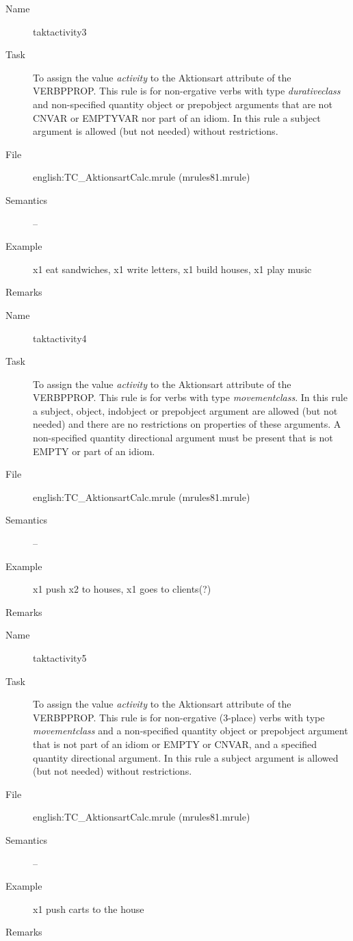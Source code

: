 \begin{description}
\vspace{1 cm}
\begin{description}
\item[Name] taktactivity3
\item[Task] To assign the value {\em activity\/} to the Aktionsart attribute of 
the VERBPPROP. This rule is for non-ergative verbs with type 
{\em durativeclass\/} 
and non-specified quantity object or prepobject arguments that 
are not CNVAR or EMPTYVAR nor part of an idiom.
In this rule a subject argument is allowed (but not needed) without
restrictions.
\item[File] english:TC\_AktionsartCalc.mrule (mrules81.mrule)
\item[Semantics] --
\item[Example] x1 eat sandwiches, x1 write letters, x1 build houses, 
x1 play music
\item[Remarks]
\end{description}

\vspace{1 cm}
\begin{description}
\item[Name] taktactivity4
\item[Task] To assign the value {\em activity\/} to the Aktionsart attribute of 
the VERBPPROP. This rule is for verbs with type {\em movementclass}.
 In this rule a subject, object, indobject  or prepobject argument are
allowed (but not needed) and there are no restrictions 
on properties of these arguments. A non-specified quantity directional argument
must be present that is not EMPTY or part of an idiom.
\item[File] english:TC\_AktionsartCalc.mrule (mrules81.mrule)
\item[Semantics] --
\item[Example] x1 push x2 to houses, x1 goes to clients(?)
\item[Remarks]
\end{description}

\vspace{1 cm}
\begin{description}
\item[Name] taktactivity5
\item[Task] To assign the value {\em activity\/} to the Aktionsart attribute of 
the VERBPPROP. This rule is for non-ergative (3-place) verbs with type {\em 
movementclass\/} and a non-specified quantity object or prepobject argument 
that is not part of an idiom or EMPTY or CNVAR,
and a specified quantity directional argument.
In this rule a subject argument is allowed (but not needed) without
restrictions.
\item[File] english:TC\_AktionsartCalc.mrule (mrules81.mrule)
\item[Semantics] --
\item[Example] x1 push carts to the house
\item[Remarks]
\end{description}


\end{description}
